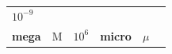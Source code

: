 {{\begin{center}
\begin{xtabular}[t]{|l|l|l|l|l|l|}
    
        
                \begin{math}{10}^{-9}\end{math}
     \tabularnewline{}
    
    
        
                \textbf{mega}
               &
    
    
        M &
    
    
        
                \begin{math}{10}^{6}\end{math}
               &
    
    
        
                \textbf{micro}
               &
    
    
        
                \begin{math}\mu \end{math}
               &
    
    

\end{xtabular}
\end{center}}}
